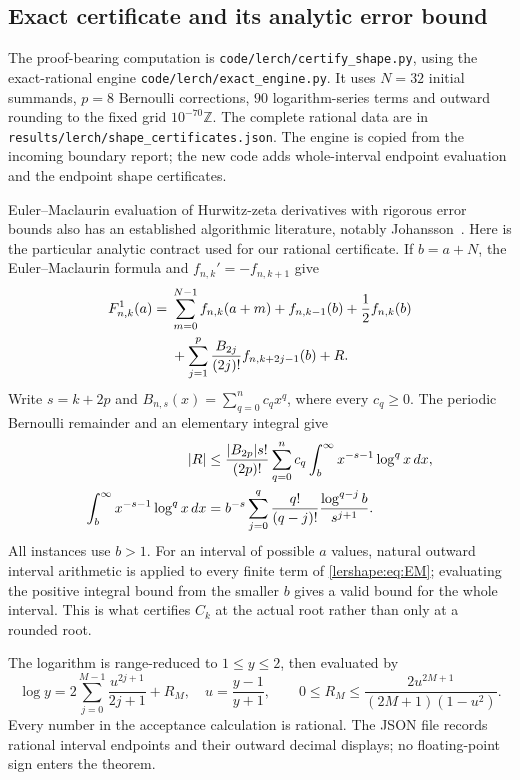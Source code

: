 \documentclass[11pt,a4paper]{article}
\numberwithin{equation}{section}
\theoremstyle{definition}
\theoremstyle{remark}
\begin{document}
\subsection{Exact certificate and its analytic error bound}

The proof-bearing computation is
\texttt{code/lerch/certify\_shape.py}, using the exact-rational engine
\texttt{code/lerch/exact\_engine.py}. It uses $N=32$ initial summands,
$p=8$ Bernoulli corrections, $90$ logarithm-series terms and outward
rounding to the fixed grid $10^{-70}\mathbb Z$. The complete rational
data are in \texttt{results/lerch/shape\_certificates.json}. The engine is
copied from the incoming boundary report; the new code adds whole-interval
endpoint evaluation and the endpoint shape certificates.

Euler--Maclaurin evaluation of Hurwitz-zeta derivatives with rigorous
error bounds also has an established algorithmic literature, notably
Johansson~\cite{lershape:Johansson}. Here is the particular analytic
contract used for our rational certificate. If $b=a+N$, the
Euler--Maclaurin formula and $f_{n,k}'=-f_{n,k+1}$ give
\begin{align}\label{lershape:eq:EM}
 F_{n,k}^{1}(a)={}&\sum_{m=0}^{N-1}f_{n,k}(a+m)
 +f_{n,k-1}(b)+\frac12f_{n,k}(b)\notag\\
 &+\sum_{j=1}^{p}\frac{B_{2j}}{(2j)!}f_{n,k+2j-1}(b)+R.
\end{align}
Write $s=k+2p$ and
$B_{n,s}(x)=\sum_{q=0}^n c_qx^q$, where every $c_q\geq0$. The
periodic Bernoulli remainder and an elementary integral give
\begin{align}\label{lershape:eq:EM-bound}
 |R|&\leq\frac{|B_{2p}|s!}{(2p)!}
 \sum_{q=0}^nc_q\int_b^\infty x^{-s-1}\log^q x\,dx,\notag\\
 \int_b^\infty x^{-s-1}\log^q x\,dx
 &=b^{-s}\sum_{j=0}^q
 \frac{q!}{(q-j)!}\frac{\log^{q-j}b}{s^{j+1}}.
\end{align}
All instances use $b>1$. For an interval of possible $a$ values, natural
outward interval arithmetic is applied to every finite term of
\eqref{lershape:eq:EM}; evaluating the positive integral bound from
the smaller $b$ gives a valid bound for the whole interval. This is what
certifies $C_k$ at the actual root rather than only at a rounded root.

The logarithm is range-reduced to $1\leq y\leq2$, then evaluated by
\[
 \log y=2\sum_{j=0}^{M-1}\frac{u^{2j+1}}{2j+1}+R_M,
 \quad u=\frac{y-1}{y+1},\qquad
 0\leq R_M\leq\frac{2u^{2M+1}}{(2M+1)(1-u^2)}.
\]
Every number in the acceptance calculation is rational. The JSON file
records rational interval endpoints and their outward decimal displays;
no floating-point sign enters the theorem.
\end{document}
